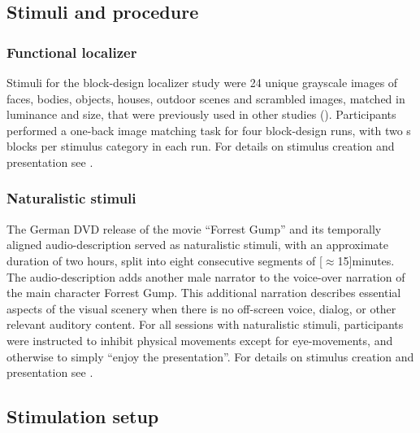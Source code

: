\subsection{Stimuli and procedure}


\subsubsection{Functional localizer}

Stimuli for the block-design localizer study were 24 unique grayscale images of
faces, bodies, objects, houses, outdoor scenes and scrambled images, matched in
luminance and size, that were previously used in other studies
(\citep[e.g.,][]{haxby2011common}).
Participants performed a one-back image matching task for four block-design
runs, with two \unit[16]{s} blocks per stimulus category in each run.
%
For details on stimulus creation and presentation see
\citet{sengupta2016extension}.


\subsubsection{Naturalistic stimuli}
The German DVD release \citep{ForrestGumpDVD} of the movie ``Forrest Gump''
\citep{ForrestGumpMovie} and its temporally aligned audio-description
\citep{ForrestGumpGermanAD} served as naturalistic stimuli, with an approximate
duration of two hours, split into eight consecutive segments of
\unit[$\approx$15]{minutes}.
The audio-description adds another male narrator to the voice-over narration of
the main character Forrest Gump. This additional narration describes essential
aspects of the visual scenery when there is no off-screen voice, dialog, or
other relevant auditory content.
For all sessions with naturalistic stimuli, participants were instructed to
inhibit physical movements except for eye-movements, and otherwise to simply
``enjoy the presentation''.
%
For details on stimulus creation and presentation see
\citet{hanke2014audiomovie, hanke2016simultaneous}.


\subsection{Stimulation setup}

